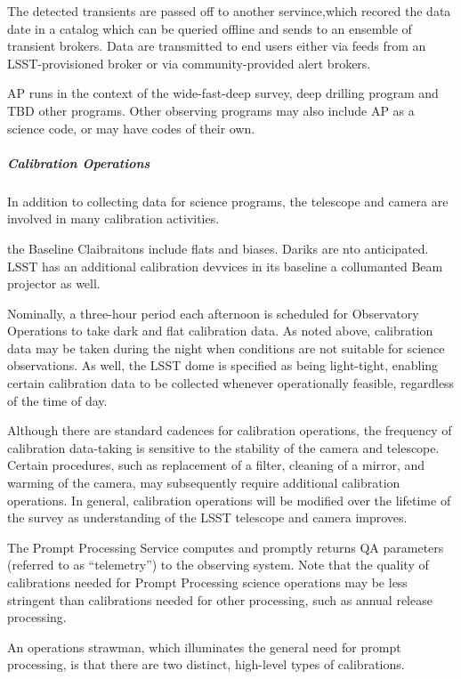 The detected transients are passed off to another servince,which
recored the data date in a catalog which can be queried offline and sends
to an ensemble of transient brokers. Data are transmitted to end
users either via feeds from an LSST-provisioned broker or via
community-provided alert brokers.

AP runs in the context of the wide-fast-deep survey, deep drilling  program and TBD
other programs. Other observing programs may also include AP as a science code,
or may have codes of their own. 

\subparagraph{Calibration Operations}

In addition to collecting data for science programs, the telescope and
camera are involved in many calibration activities.

the Baseline Claibraitons include flats and biases. Dariks are nto anticipated.
LSST has an additional calibration devvices in its baseline a collumanted
Beam projector as well.

Nominally, a three-hour period each afternoon is scheduled for Observatory
Operations to take dark and flat calibration data. As noted above, calibration data
may be taken during the night when conditions are not suitable for
science observations. As well, the LSST dome is specified as being
light-tight, enabling certain calibration data to be collected
whenever operationally feasible, regardless of the time of day.

Although there are standard cadences for calibration operations, the
frequency of calibration data-taking is sensitive to the stability of
the camera and telescope. Certain procedures, such as replacement of a
filter, cleaning of a mirror, and warming of the camera, may
subsequently require additional calibration operations. In general,
calibration operations will be modified over the lifetime of the
survey as understanding of the LSST telescope and camera improves.

The Prompt Processing Service computes and promptly returns QA
parameters (referred to as “telemetry”) to the observing system. Note
that the quality of calibrations needed for Prompt Processing science
operations may be less stringent than calibrations needed for other
processing, such as annual release processing.

An operations strawman, which illuminates the general need for prompt
processing, is that there are two distinct, high-level types of
calibrations.

